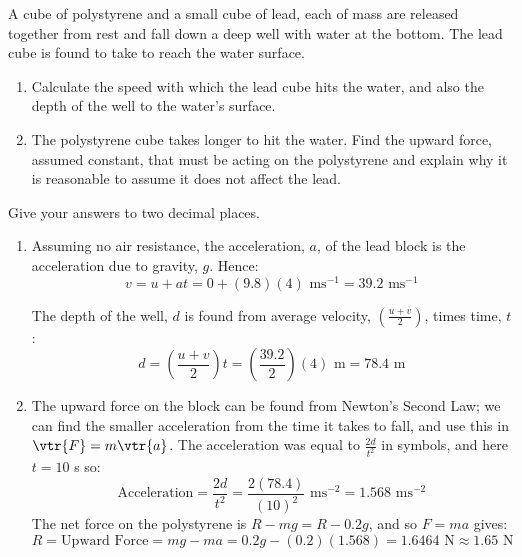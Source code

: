
\begin{problem}[O1978PIIQ1a]
{A cube of polystyrene and a small cube of lead, each of mass  are released together from rest and fall down a deep well with water at the bottom. The lead cube is found to take  to reach the water surface.
\begin{enumerate}
	\item Calculate the speed with which the lead cube hits the water, and also the depth of the well to the water's surface. 
	\item The polystyrene cube takes  longer to hit the water. Find the upward force, assumed constant, that must be acting on the polystyrene and explain why it is reasonable to assume it does not affect the lead. 
\end{enumerate}
Give your answers to two decimal places.} 
{}
{\begin{enumerate}
\item Assuming no air resistance, the acceleration, $a$, of the lead block is the acceleration due to gravity, $g$. Hence:
\begin{equation*}
v = u + at = 0 + (9.8)(4) \textrm{ ms}^{-1} = 39.2 \textrm{ ms}^{-1} 
\end{equation*}

The depth of the well, $d$ is found from average velocity, $\left(\frac{u + v}{2}\right)$, times time, $t$:
\begin{equation*} d = \left(\frac{u + v}{2}\right)t = \left(\frac{39.2}{2}\right)(4) \textrm{ m} = 78.4 \textrm{ m} \end{equation*}
\item The upward force on the block can be found from Newton's Second Law; we can find the smaller acceleration from the time it takes to fall, and use this in $\vtr{F} = m\vtr{a}$. The acceleration was equal to $\frac{2d}{t^{2}}$ in symbols, and here $t = 10$ s so:
\begin{equation*} \textrm{Acceleration} = \frac{2d}{t^{2}} = \frac{2(78.4)}{(10)^{2}} \textrm{ ms}^{-2} = 1.568 \textrm{ ms}^{-2} \end{equation*}
The net force on the polystyrene is $R - mg = R - 0.2g$, and so $F = ma$ gives:
\begin{equation*} R = \textrm{Upward Force} = mg - ma = 0.2g - (0.2)(1.568) = 1.6464 \textrm{ N} \approx 1.65 \textrm{ N} \end{equation*}


\end{enumerate}}
\end{problem}
